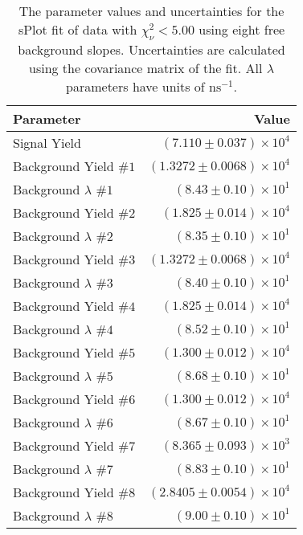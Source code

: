
\begin{table}[ht]
    \begin{center}
        \begin{tabular}{lr}\toprule
            Parameter & Value \\\midrule
            Signal Yield & $(7.110 \pm 0.037) \times 10^{4}$ \\
            Background Yield $\#1$ & $(1.3272 \pm 0.0068) \times 10^{4}$ \\
            Background $\lambda$ $\#1$ & $(8.43 \pm 0.10) \times 10^{1}$ \\
            Background Yield $\#2$ & $(1.825 \pm 0.014) \times 10^{4}$ \\
            Background $\lambda$ $\#2$ & $(8.35 \pm 0.10) \times 10^{1}$ \\
            Background Yield $\#3$ & $(1.3272 \pm 0.0068) \times 10^{4}$ \\
            Background $\lambda$ $\#3$ & $(8.40 \pm 0.10) \times 10^{1}$ \\
            Background Yield $\#4$ & $(1.825 \pm 0.014) \times 10^{4}$ \\
            Background $\lambda$ $\#4$ & $(8.52 \pm 0.10) \times 10^{1}$ \\
            Background Yield $\#5$ & $(1.300 \pm 0.012) \times 10^{4}$ \\
            Background $\lambda$ $\#5$ & $(8.68 \pm 0.10) \times 10^{1}$ \\
            Background Yield $\#6$ & $(1.300 \pm 0.012) \times 10^{4}$ \\
            Background $\lambda$ $\#6$ & $(8.67 \pm 0.10) \times 10^{1}$ \\
            Background Yield $\#7$ & $(8.365 \pm 0.093) \times 10^{3}$ \\
            Background $\lambda$ $\#7$ & $(8.83 \pm 0.10) \times 10^{1}$ \\
            Background Yield $\#8$ & $(2.8405 \pm 0.0054) \times 10^{4}$ \\
            Background $\lambda$ $\#8$ & $(9.00 \pm 0.10) \times 10^{1}$ \\\bottomrule
        \end{tabular}
        \caption{The parameter values and uncertainties for the sPlot fit of data with $\chi^2_\nu < 5.00$ using eight free background slopes. Uncertainties are calculated using the covariance matrix of the fit. All $\lambda$ parameters have units of $\si{\nano\second}^{-1}$.}\label{tab:splot-fit-results-chisqdof-5.00-free-8}
    \end{center}
\end{table}
